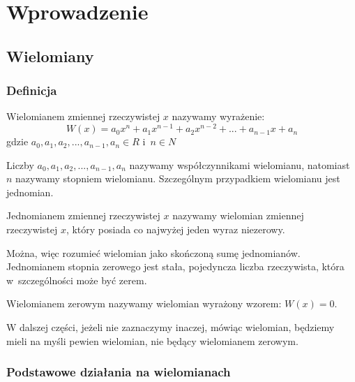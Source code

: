 \chapter{Wprowadzenie}

\section{Wielomiany}

\subsection{Definicja}

\begin{definition}
	$ $\\
	Wielomianem zmiennej rzeczywistej $x$ nazywamy wyrażenie:
	\begin{equation*}
	W(x) = a_0x^n + a_1x^{n-1} + a_2x^{n-2}+ ... + a_{n-1}x + a_n
	\end{equation*}
	gdzie $a_0, a_1, a_2, ..., a_{n-1}, a_n\in R$ i~$n \in N$
\end{definition}

Liczby $a_0, a_1, a_2, ..., a_{n-1}, a_n$ nazywamy współczynnikami wielomianu, natomiast $n$ nazywamy stopniem wielomianu. Szczególnym przypadkiem wielomianu jest jednomian. 

\begin{definition}
	$ $\\
	Jednomianem zmiennej rzeczywistej $x$ nazywamy wielomian zmiennej rzeczywistej $x$, który posiada co najwyżej jeden wyraz niezerowy.
\end{definition}

Można, więc rozumieć wielomian jako skończoną sumę jednomianów.
Jednomianem stopnia zerowego jest stała, pojedyncza liczba rzeczywista, która w~szczególności może być zerem.

\begin{definition}
	$ $\\
	Wielomianem zerowym nazywamy wielomian wyrażony wzorem:	$W(x) = 0$.
\end{definition}

W dalszej części, jeżeli nie zaznaczymy inaczej, mówiąc wielomian, będziemy mieli na myśli pewien wielomian, nie będący wielomianem zerowym.

\subsection{Podstawowe działania na wielomianach}

